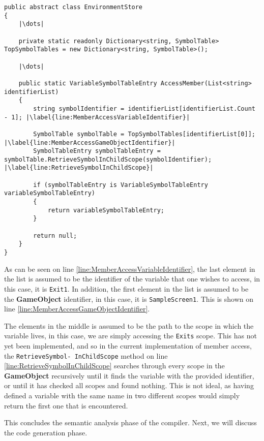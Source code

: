 \begin{lstlisting}[language=CSharp, caption={Visit assignment}, label={lst:VisitAssignment},escapechar=|]
public abstract class EnvironmentStore
{
	|\dots|

	private static readonly Dictionary<string, SymbolTable> TopSymbolTables = new Dictionary<string, SymbolTable>();
	
	|\dots|

	public static VariableSymbolTableEntry AccessMember(List<string> identifierList)
	{
		string symbolIdentifier = identifierList[identifierList.Count - 1]; |\label{line:MemberAccessVariableIdentifier}|
		
		SymbolTable symbolTable = TopSymbolTables[identifierList[0]]; |\label{line:MemberAccessGameObjectIdentifier}|
		SymbolTableEntry symbolTableEntry = symbolTable.RetrieveSymbolInChildScope(symbolIdentifier); |\label{line:RetrieveSymbolInChildScope}|

		if (symbolTableEntry is VariableSymbolTableEntry variableSymbolTableEntry)
		{
			return variableSymbolTableEntry;
		}
		
		return null;
	}
}
\end{lstlisting}

As can be seen on line \ref{line:MemberAccessVariableIdentifier}, the last element in the list is assumed to be the identifier of the variable that one wishes to access, in this case, it is \texttt{Exit1}.
In addition, the first element in the list is assumed to be the \textbf{GameObject} identifier, in this case, it is \texttt{SampleScreen1}. 
This is shown on line \ref{line:MemberAccessGameObjectIdentifier}.

The elements in the middle is assumed to be the path to the scope in which the variable lives, in this case, we are simply accessing the \texttt{Exits} scope. 
This has not yet been implemented, and so in the current implementation of member access, the \texttt{RetrieveSymbol-
InChildScope} method on line \ref{line:RetrieveSymbolInChildScope} searches through every scope in the \textbf{GameObject} recursively until it finds the variable with the provided identifier, or until it has checked all scopes and found nothing. This is not ideal, as having defined a variable with the same name in two different scopes would simply return the first one that is encountered.


This concludes the semantic analysis phase of the compiler. Next, we will discuss the code generation phase.
